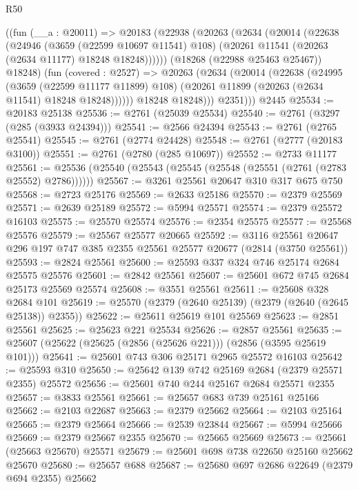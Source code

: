 \begin{lexlean}{R50}
\begin{coremodule}
        ((fun (__a : @20011) =>
        @20183
          (@22938
            (@20263
              (@2634
                (@20014
                  (@22638
                    (@24946
                      (@3659 (@22599 @10697 @11541) @108)
                      (@20261 @11541 (@20263 (@2634 @11177) @18248 @18248))))))
              (@18268 (@22988 @25463 @25467))
              @18248)
            (fun (covered : @2527) =>
            @20263
              (@2634
                (@20014
                  (@22638
                    (@24995
                      (@3659 (@22599 @11177 @11899) @108)
                      (@20261 @11899 (@20263 (@2634 @11541) @18248 @18248))))))
              @18248
              @18248)))
          @2351)))
    @2445
@25534 := @20183 @25138
@25536 := @2761 (@25039 @25534)
@25540 := @2761 (@3297 (@285 (@3933 @24394)))
@25541 := @2566 @24394
@25543 := @2761 (@2765 @25541)
@25545 := @2761 (@2774 @24428)
@25548 := @2761 (@2777 (@20183 @3100))
@25551 := @2761 (@2780 (@285 @10697))
@25552 := @2733 @11177
@25561 := @25536 (@25540 (@25543 (@25545 (@25548 (@25551 (@2761 (@2783 @25552) @2786))))))
@25567 := @3261 @25561 @20647 @310 @317 @675 @750
@25568 := @2723 @25176
@25569 := @2633 @25186
@25570 := @2379 @25569
@25571 := @2639 @25189
@25572 := @5994 @25571
@25574 := @2379 @25572 @16103
@25575 := @25570 @25574
@25576 := @2354 @25575
@25577 := @25568 @25576
@25579 := @25567 @25577 @20665
@25592 := @3116 @25561 @20647 @296 @197 @747 @385 @2355 @25561 @25577 @20677 (@2814 (@3750 @25561))
@25593 := @2824 @25561
@25600 := @25593 @337 @324 @746 @25174 @2684 @25575 @25576
@25601 := @2842 @25561
@25607 := @25601 @672 @745 @2684 @25173 @25569 @25574
@25608 := @3551 @25561
@25611 := @25608 @328 @2684 @101
@25619 := @25570 (@2379 (@2640 @25139) (@2379 (@2640 (@2645 @25138)) @2355))
@25622 := @25611 @25619 @101 @25569
@25623 := @2851 @25561
@25625 := @25623 @221 @25534
@25626 := @2857 @25561
@25635 := @25607 (@25622 (@25625 (@2856 (@25626 @221))) (@2856 (@3595 @25619 @101)))
@25641 := @25601 @743 @306 @25171 @2965 @25572 @16103
@25642 := @25593 @310
@25650 := @25642 @139 @742 @25169 @2684 (@2379 @25571 @2355) @25572
@25656 := @25601 @740 @244 @25167 @2684 @25571 @2355
@25657 := @3833 @25561
@25661 := @25657 @683 @739 @25161 @25166
@25662 := @2103 @22687
@25663 := @2379 @25662
@25664 := @2103 @25164
@25665 := @2379 @25664
@25666 := @2539 @23844
@25667 := @5994 @25666
@25669 := @2379 @25667 @2355
@25670 := @25665 @25669
@25673 := @25661 (@25663 @25670) @25571
@25679 := @25601 @698 @738 @22650 @25160 @25662 @25670
@25680 := @25657 @688
@25687 := @25680 @697 @2686 @22649 (@2379 @694 @2355) @25662

\end{coremodule}
\end{lexlean}
